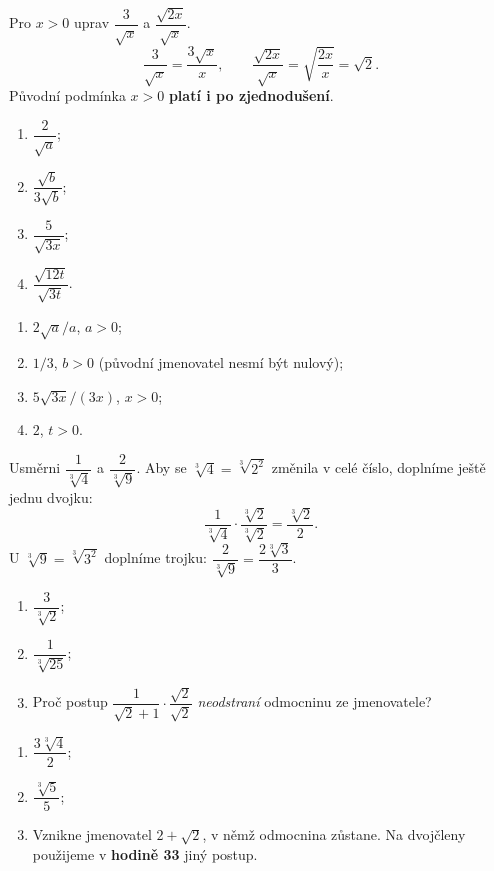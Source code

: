 \documentclass[11pt,a4paper]{article}
\begin{document}
\begin{prikladReseniBox}[breakable=false,title={Příklad 3: usměrňování s proměnnou}]
Pro $x>0$ uprav $\dfrac3{\sqrt x}$ a $\dfrac{\sqrt{2x}}{\sqrt x}$.
\tcblower
\[
\frac3{\sqrt x}=\boxed{\frac{3\sqrt x}{x}},\qquad
\frac{\sqrt{2x}}{\sqrt x}=\sqrt{\frac{2x}{x}}=\boxed{\sqrt2}.
\]
Původní podmínka $x>0$ \textbf{platí i po zjednodušení}.
\end{prikladReseniBox}
\begin{zadaniReseniBox}[breakable=false,title={Samostatná práce 3: určuj i definiční obor}]
\begin{enumerate}[label=\alph*)]
\item $\dfrac{2}{\sqrt a}$;
\item $\dfrac{\sqrt b}{3\sqrt b}$;
\item $\dfrac5{\sqrt{3x}}$;
\item $\dfrac{\sqrt{12t}}{\sqrt{3t}}$.
\end{enumerate}
\tcblower
\begin{enumerate}[label=\alph*)]
\item $2\sqrt a/a$, $a>0$;
\item $1/3$, $b>0$ (původní jmenovatel nesmí být nulový);
\item $5\sqrt{3x}/(3x)$, $x>0$;
\item $2$, $t>0$.
\end{enumerate}
\end{zadaniReseniBox}

\begin{prikladReseniBox}[breakable=false,title={Rozšiřující příklad 1: doplň do třetí mocniny}]
Usměrni $\dfrac1{\sqrt[3]4}$ a $\dfrac2{\sqrt[3]9}$.
\tcblower
Aby se $\sqrt[3]4=\sqrt[3]{2^2}$ změnila v celé číslo,
doplníme ještě jednu dvojku:
\[
\frac1{\sqrt[3]4}\cdot\frac{\sqrt[3]2}{\sqrt[3]2}
=\frac{\sqrt[3]2}{2}.
\]
U $\sqrt[3]9=\sqrt[3]{3^2}$ doplníme trojku:
$\dfrac2{\sqrt[3]9}=\dfrac{2\sqrt[3]3}{3}$.
\end{prikladReseniBox}

\begin{zadaniReseniBox}[breakable=false,title={Rozšiřující příklad 2: rozhodni, co násobit}]
\begin{enumerate}[label=\alph*)]
\item $\dfrac3{\sqrt[3]2}$;
\item $\dfrac1{\sqrt[3]{25}}$;
\item Proč postup $\dfrac1{\sqrt2+1}\cdot\dfrac{\sqrt2}{\sqrt2}$
\emph{neodstraní} odmocninu ze jmenovatele?
\end{enumerate}
\tcblower
\begin{enumerate}[label=\alph*)]
\item $\dfrac{3\sqrt[3]4}{2}$;
\item $\dfrac{\sqrt[3]5}{5}$;
\item Vznikne jmenovatel $2+\sqrt2$, v němž odmocnina zůstane.
Na dvojčleny použijeme v \textbf{hodině 33} jiný postup.
\end{enumerate}
\end{zadaniReseniBox}
\end{document}
